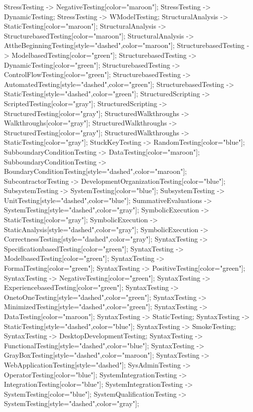 \documentclass{article}
\begin{document}
{StressTesting -> NegativeTesting[color="maroon"];
StressTesting -> DynamicTesting;
StressTesting -> WModelTesting;
StructuralAnalysis -> StaticTesting[color="maroon"];
StructuralAnalysis -> StructurebasedTesting[color="maroon"];
StructuralAnalysis -> AttheBeginningTesting[style="dashed",color="maroon"];
StructurebasedTesting -> ModelbasedTesting[color="green"];
StructurebasedTesting -> DynamicTesting[color="green"];
StructurebasedTesting -> ControlFlowTesting[color="green"];
StructurebasedTesting -> AutomatedTesting[style="dashed",color="green"];
StructurebasedTesting -> StaticTesting[style="dashed",color="green"];
StructuredScripting -> ScriptedTesting[color="gray"];
StructuredScripting -> StructuredTesting[color="gray"];
StructuredWalkthroughs -> Walkthroughs[color="gray"];
StructuredWalkthroughs -> StructuredTesting[color="gray"];
StructuredWalkthroughs -> StaticTesting[color="gray"];
StuckKeyTesting -> RandomTesting[color="blue"];
SubboundaryConditionTesting -> DataTesting[color="maroon"];
SubboundaryConditionTesting -> BoundaryConditionTesting[style="dashed",color="maroon"];
SubcontractorTesting -> DevelopmentOrganizationTesting[color="blue"];
SubsystemTesting -> SystemTesting[color="blue"];
SubsystemTesting -> UnitTesting[style="dashed",color="blue"];
SummativeEvaluations -> SystemTesting[style="dashed",color="gray"];
SymbolicExecution -> StaticTesting[color="gray"];
SymbolicExecution -> StaticAnalysis[style="dashed",color="gray"];
SymbolicExecution -> CorrectnessTesting[style="dashed",color="gray"];
SyntaxTesting -> SpecificationbasedTesting[color="green"];
SyntaxTesting -> ModelbasedTesting[color="green"];
SyntaxTesting -> FormalTesting[color="green"];
SyntaxTesting -> PositiveTesting[color="green"];
SyntaxTesting -> NegativeTesting[color="green"];
SyntaxTesting -> ExperiencebasedTesting[color="green"];
SyntaxTesting -> OnetoOneTesting[style="dashed",color="green"];
SyntaxTesting -> MinimizedTesting[style="dashed",color="green"];
SyntaxTesting -> DataTesting[color="maroon"];
SyntaxTesting -> StaticTesting;
SyntaxTesting -> StaticTesting[style="dashed",color="blue"];
SyntaxTesting -> SmokeTesting;
SyntaxTesting -> DesktopDevelopmentTesting;
SyntaxTesting -> FunctionalTesting[style="dashed",color="blue"];
SyntaxTesting -> GrayBoxTesting[style="dashed",color="maroon"];
SyntaxTesting -> WebApplicationTesting[style="dashed"];
SysAdminTesting -> OperatorTesting[color="blue"];
SystemIntegrationTesting -> IntegrationTesting[color="blue"];
SystemIntegrationTesting -> SystemTesting[color="blue"];
SystemQualificationTesting -> SystemTesting[style="dashed",color="gray"];
}
\end{document}
